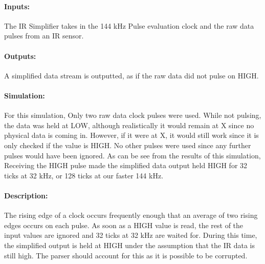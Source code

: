 \documentclass[]{article}
\begin{document}
\paragraph{Inputs:} The IR Simplifier takes in the 144 kHz Pulse evaluation clock and the raw data pulses from an IR sensor. 
\paragraph{Outputs:} A simplified data stream is outputted, as if the raw data did not pulse on HIGH.
\paragraph{Simulation:} For this simulation, Only two raw data clock pulses were used. While not pulsing, the data was held at LOW, although realistically it would remain at X since no physical data is coming in. However, if it were at X, it would still work since it is only checked if the value is HIGH. No other pulses were used since any further pulses would have been ignored.
As can be see from the results of this simulation, Receiving the HIGH pulse made the simplified data output held HIGH for 32 ticks at 32 kHz, or 128 ticks at our faster 144 kHz.
\paragraph{Description:} The rising edge of a clock occurs frequently enough that an average of two rising edges occurs on each pulse. As soon as a HIGH value is read, the rest of the input values are ignored and 32 ticks at 32 kHz are waited for. During this time, the simplified output is held at HIGH under the assumption that the IR data is still high. The parser should account for this as it is possible to be corrupted.
\end{document}
